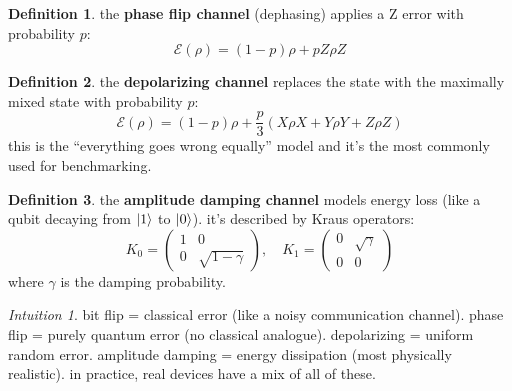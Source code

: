 \documentclass[11pt,a4paper]{article}
\theoremstyle{definition}
\newtheorem{definition}{Definition}[section]
\theoremstyle{remark}
\newtheorem*{intuition}{Intuition}
\begin{document}
\begin{definition}
the \textbf{phase flip channel} (dephasing) applies a Z error with probability $p$:
\[
\mathcal{E}(\rho) = (1-p)\rho + p Z\rho Z
\]
\end{definition}

\begin{definition}
the \textbf{depolarizing channel} replaces the state with the maximally mixed state with probability $p$:
\[
\mathcal{E}(\rho) = (1-p)\rho + \frac{p}{3}(X\rho X + Y\rho Y + Z\rho Z)
\]
this is the ``everything goes wrong equally'' model and it's the most commonly used for benchmarking.
\end{definition}

\begin{definition}
the \textbf{amplitude damping channel} models energy loss (like a qubit decaying from $\ket{1}$ to $\ket{0}$). it's described by Kraus operators:
\[
K_0 = \begin{pmatrix} 1 & 0 \\ 0 & \sqrt{1-\gamma} \end{pmatrix}, \quad
K_1 = \begin{pmatrix} 0 & \sqrt{\gamma} \\ 0 & 0 \end{pmatrix}
\]
where $\gamma$ is the damping probability.
\end{definition}

\begin{intuition}
bit flip = classical error (like a noisy communication channel). phase flip = purely quantum error (no classical analogue). depolarizing = uniform random error. amplitude damping = energy dissipation (most physically realistic). in practice, real devices have a mix of all of these.
\end{intuition}
\end{document}

